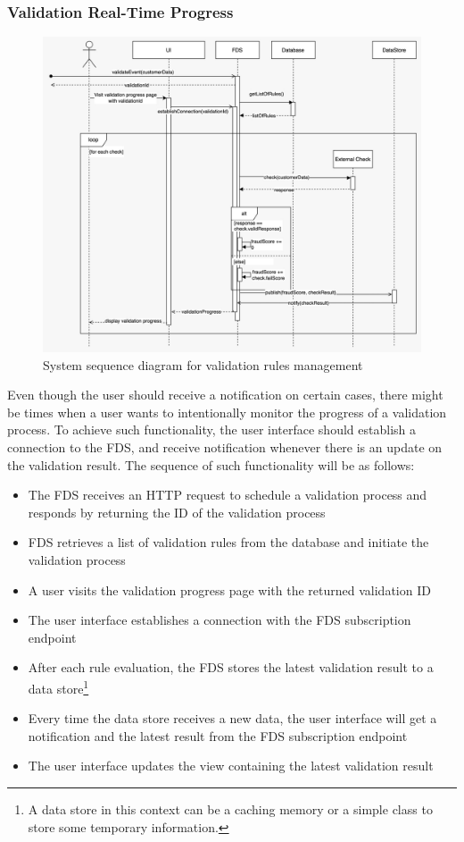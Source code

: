\subsubsection{Validation Real-Time Progress}

\begin{figure}[!ht]
 \includegraphics[width=\textwidth]{diagrams/sequence_pubsub.jpeg}
 \caption{System sequence diagram for validation rules management}
\end{figure}

Even though the user should receive a notification on certain cases, there might be times when a user wants to intentionally monitor the progress of a validation process. To achieve such functionality, the user interface should establish a connection to the FDS, and receive notification whenever there is an update on the validation result. The sequence of such functionality will be as follows:

\begin{itemize}
 \item The FDS receives an HTTP request to schedule a validation process and responds by returning the ID of the validation process
 \item FDS retrieves a list of validation rules from the database and initiate the validation process
 \item A user visits the validation progress page with the returned validation ID
 \item The user interface establishes a connection with the FDS subscription endpoint
 \item After each rule evaluation, the FDS stores the latest validation result to a data store\footnote{A data store in this context can be a caching memory or a simple class to store some temporary information.}
 \item Every time the data store receives a new data, the user interface will get a notification and the latest result from the FDS subscription endpoint
 \item The user interface updates the view containing the latest validation result
\end{itemize}


